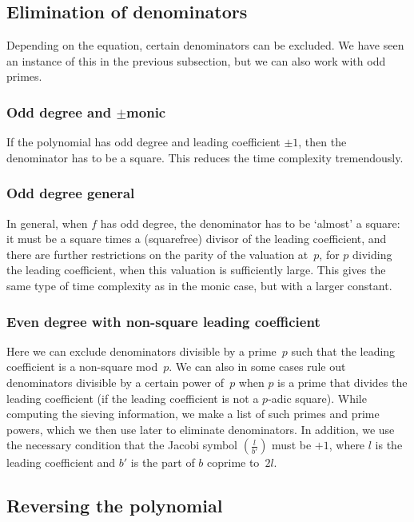 \documentclass[12pt,a4paper,oneside]{amsart}
\begin{document}
\subsection{Elimination of denominators}

Depending on the equation, certain denominators can be excluded. We have
seen an instance of this in the previous subsection, but we can also work
with odd primes.

\subsubsection{Odd degree and $\pm$monic}

If the polynomial has odd degree and leading coefficient $\pm 1$, then
the denominator has to be a square. This reduces the time complexity
tremendously.

\subsubsection{Odd degree general}

In general, when $f$ has odd degree, the denominator has to be `almost'
a square: it must be a square times a (squarefree) divisor of the leading
coefficient, and there are further restrictions on the parity of the
valuation at~$p$, for $p$ dividing the leading coefficient, when this
valuation is sufficiently large. This gives the same type of time complexity
as in the monic case, but with a larger constant.

\subsubsection{Even degree with non-square leading coefficient}

Here we can exclude denominators divisible by a prime~$p$ such that the
leading coefficient is a non-square mod~$p$. We can also in some cases
rule out denominators divisible by a certain power of~$p$ when $p$ is
a prime that divides the leading coefficient (if the leading coefficient
is not a $p$-adic square). While computing the sieving information, we
make a list of such primes and prime powers, which we then use later to
eliminate denominators. In addition, we use the necessary condition that
the Jacobi symbol $\left(\frac{l}{b'}\right)$ must be $+1$, where
$l$ is the leading coefficient and $b'$ is the part of $b$ coprime to~$2l$.

\subsection{Reversing the polynomial}
\end{document}
